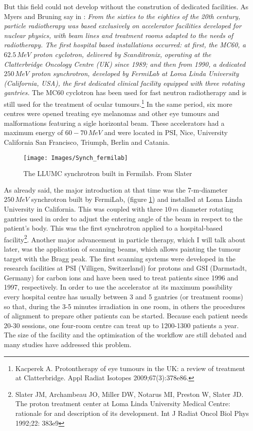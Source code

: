 \documentclass[12pt, a4paper, twoside]{book}
\begin{document}
But this field could not develop without the constrution of dedicated facilities. 
As Myers and Bruning say in \cite{mye:acc}: \emph{From the sixties to the eighties of the 20th century, particle radiotherapy was based exclusively on accelerator facilities developed for nuclear physics, with beam lines and treatment rooms adapted to the needs of radiotherapy. The first hospital based installations occurred: at first, the MC60, a $62.5\,MeV$ proton cyclotron, delivered by Scanditronix, operating at the Clatterbridge Oncology Centre (UK) since 1989; and then from 1990, a dedicated $250\,MeV$ proton synchrotron, developed by FermiLab at Loma Linda University (California, USA), the first dedicated clinical facility equipped with three rotating gantries.}
The MC60 cyclotron has been used for fast neutron radiotherapy and is still used for the treatment of ocular tumours.\footnote{Kacperek A. Protontherapy of eye tumours in the UK: a review of treatment at
Clatterbridge. Appl Radiat Isotopes 2009;67(3):378e86.} In the same period, six more centres were opened treating eye melanomas and other eye tumours and malformations featuring a sigle horizontal beam. These accelerators had a maximum energy of $60-70\,MeV$ and were located in PSI, Nice, University California San Francisco, Triumph, Berlin and Catania.
\begin{figure}[!t]
\centering
{\texttt{[image: Images/Synch\_fermilab]}}
\caption{The LLUMC synchrotron built in Fermilab. From Slater \cite{jd:llu}}
\label{fig:synchF}
\end{figure}
As already said, the major introduction at that time was the 7-m-diameter $250\,MeV$ synchrotron built by FermiLab, (figure \ref{fig:synchF}) and installed at Loma Linda University in California. This was coupled with three $10\,m$ diameter rotating gantries used in order to adjust the entering angle of the beam in respect to the patient's body.
This was the first synchrotron applied to a hospital-based facility\footnote{Slater JM, Archambeau JO, Miller DW, Notarus MI, Preston W, Slater JD. The proton treatment center at Loma Linda University Medical Centre: rationale
for and description of its development. Int J Radiat Oncol Biol Phys 1992;22: 383e9}.
Another major advancement in particle therapy, which I will talk about later, was the application of scanning beams, which allows painting the tumour target with the Bragg peak.
The first scanning systems were developed in the research facilities at PSI (Villigen, Switzerland) for protons and GSI (Darmstadt, Germany) for carbon ions and have been used to treat patients since 1996 and 1997, respectively.
In order to use the accelerator at its maximum possibility every hospital centre has usually between 3 and 5 gantries (or treatment rooms) so that, during the 3-5 minutes irradiation in one room, in others the procedures of alignment to prepare other patients can be started. Because each patient needs 20-30 sessions, one four-room centre can treat up to 1200-1300 patients a year. The size of the facility and the optimisation of the workflow are still debated and many studies have addressed this problem.
\end{document}
